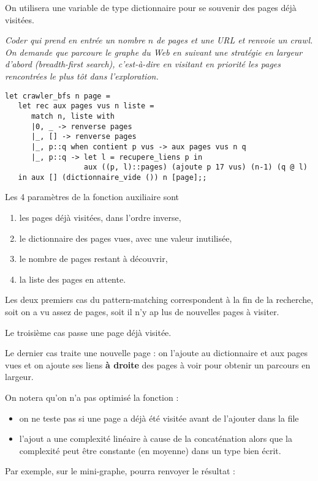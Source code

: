 On utilisera une variable de type dictionnaire pour se souvenir des pages déjà visitées.
\begin{Exercise}\it 
Coder  qui prend en entrée un nombre $n$ de pages et une URL  et renvoie un crawl. On demande que  parcoure
le graphe du Web en suivant une stratégie en largeur d'abord (breadth-first search), c'est-à-dire en visitant en priorité les pages rencontrées le plus tôt dans l'exploration.  
\end{Exercise}
\begin{Answer}
\begin{lstlisting}
let crawler_bfs n page =
   let rec aux pages vus n liste = 
      match n, liste with
      |0, _ -> renverse pages
      |_, [] -> renverse pages
      |_, p::q when contient p vus -> aux pages vus n q
      |_, p::q -> let l = recupere_liens p in
                  aux ((p, l)::pages) (ajoute p 17 vus) (n-1) (q @ l)
   in aux [] (dictionnaire_vide ()) n [page];;
\end{lstlisting}
Les 4 paramètres de la fonction auxiliaire sont
\begin{enumerate}
    \item les pages déjà visitées, dans l'ordre inverse,
    \item le dictionnaire des pages vues, avec une valeur inutilisée,
    \item le nombre de pages restant à découvrir,
    \item la liste des pages en attente.
\end{enumerate}

Les deux premiers cas du pattern-matching correspondent à la fin de la recherche, soit on a vu assez de pages, soit il n'y ap lus de nouvelles pages à visiter.

Le troisième cas passe une page déjà visitée.

Le dernier cas traite une nouvelle page : on l'ajoute au dictionnaire et aux pages vues et on ajoute ses liens {\bf à droite} des pages à voir pour obtenir un parcours en largeur.

On notera qu'on n'a pas optimisé la fonction :
\begin{itemize}
    \item on ne teste pas si une page a déjà été visitée avant de l'ajouter dans la file
    \item l'ajout a une complexité linéaire à cause de la concaténation alors que la complexité peut être constante (en moyenne) dans un type bien écrit.
\end{itemize}
\end{Answer}
Par exemple, sur le mini-graphe,  pourra renvoyer le résultat :

